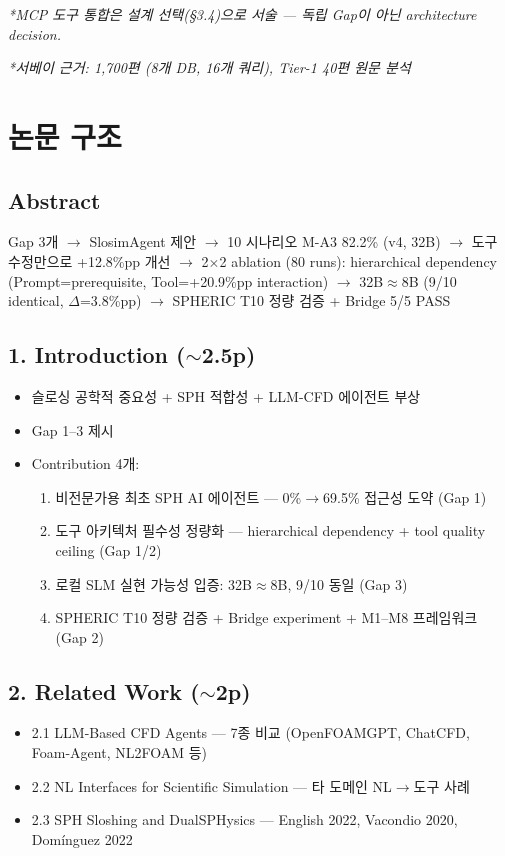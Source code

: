 \documentclass[11pt,a4paper]{article}
\begin{document}
\textit{*MCP 도구 통합은 설계 선택(§3.4)으로 서술 --- 독립 Gap이 아닌 architecture decision.}

\textit{*서베이 근거: 1,700편 (8개 DB, 16개 쿼리), Tier-1 40편 원문 분석}

\section{논문 구조}

\subsection{Abstract}
Gap 3개 $\rightarrow$ SlosimAgent 제안 $\rightarrow$ 10 시나리오 M-A3 82.2\% (v4, 32B) $\rightarrow$ 도구 수정만으로 +12.8\%pp 개선 $\rightarrow$ 2$\times$2 ablation (80 runs): hierarchical dependency (Prompt=prerequisite, Tool=+20.9\%pp interaction) $\rightarrow$ 32B$\approx$8B (9/10 identical, $\Delta$=3.8\%pp) $\rightarrow$ SPHERIC T10 정량 검증 + Bridge 5/5 PASS

\subsection{1. Introduction ({\small\color{gray}$\sim$2.5p})}
\begin{itemize}[nosep,leftmargin=1.5em]
\item 슬로싱 공학적 중요성 + SPH 적합성 + LLM-CFD 에이전트 부상
\item Gap 1--3 제시
\item Contribution 4개:
  \begin{enumerate}[nosep,leftmargin=1em]
  \item 비전문가용 최초 SPH AI 에이전트 --- 0\%$\rightarrow$69.5\% 접근성 도약 (Gap 1)
  \item 도구 아키텍처 필수성 정량화 --- hierarchical dependency + tool quality ceiling (Gap 1/2)
  \item 로컬 SLM 실현 가능성 입증: 32B$\approx$8B, 9/10 동일 (Gap 3)
  \item SPHERIC T10 정량 검증 + Bridge experiment + M1--M8 프레임워크 (Gap 2)
  \end{enumerate}
\end{itemize}

\subsection{2. Related Work ({\small\color{gray}$\sim$2p})}
\begin{itemize}[nosep,leftmargin=1.5em]
\item 2.1 LLM-Based CFD Agents --- 7종 비교 (OpenFOAMGPT, ChatCFD, Foam-Agent, NL2FOAM 등)
\item 2.2 NL Interfaces for Scientific Simulation --- 타 도메인 NL$\rightarrow$도구 사례
\item 2.3 SPH Sloshing and DualSPHysics --- English 2022, Vacondio 2020, Domínguez 2022
\end{itemize}
\end{document}
